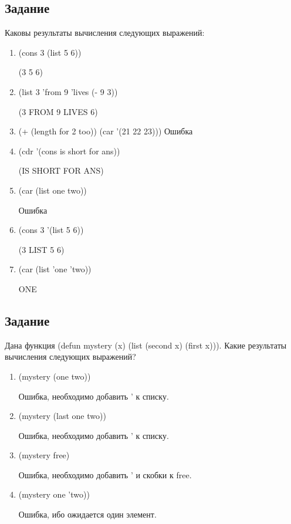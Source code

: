 \subsection{Задание }

Каковы результаты вычисления следующих выражений:
\begin{enumerate}[label*=\arabic*.]
	\item (cons 3 (list 5 6))
	
	(3 5 6)

	\item (list 3 'from 9 'lives (- 9 3))
	
	(3 FROM 9 LIVES 6)
	
	\item (+ (length for 2 too)) (car '(21 22 23)))
	Ошибка
	
	\item (cdr '(cons is short for ans))
	
	(IS SHORT FOR ANS)
	
	\item (car (list one two))
	
	Ошибка
	
	\item (cons 3 '(list 5 6))
	
	(3 LIST 5 6)
	
	\item (car (list 'one 'two))

	ONE	
\end{enumerate} 

\subsection{Задание }

Дана функция (defun mystery (x) (list (second x) (first x))). Какие результаты вычисления следующих выражений?


\begin{enumerate}[label*=\arabic*.]
	\item (mystery (one two))
	
	Ошибка, необходимо добавить ' к списку.

	\item (mystery (last one two))
	
	Ошибка, необходимо добавить ' к списку.
	
	\item (mystery free)
	
	Ошибка, необходимо добавить '  и скобки к free.
	
	\item (mystery one 'two))
	
	Ошибка, ибо ожидается один элемент. 
	
\end{enumerate} 


